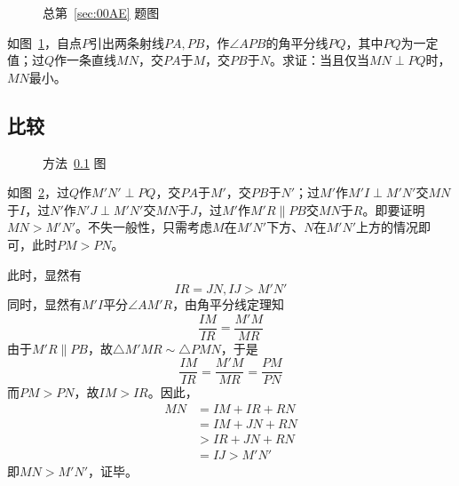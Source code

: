 

\begin{figure}[htbp]
  \centering {}
  \caption{总第~\ref{sec:00AE} 题图} \label{fig:00AE}
\end{figure}

如图~\ref{fig:00AE}，自点$P$引出两条射线$PA, PB$，作$\angle APB$的角平分线$PQ$，其中$PQ$为一定值；过$Q$作一条直线$MN$，交$PA$于$M$，交$PB$于$N$。求证：当且仅当$MN \perp PQ$时，$MN$最小。

\subsection{比较} \label{subsec:00AE-cmp}

\begin{figure}[htbp]
  \centering {}
  \caption{方法~\ref{subsec:00AE-cmp} 图} \label{fig:00AE-cmp}
\end{figure}

如图~\ref{fig:00AE-cmp}，过$Q$作$M'N' \perp PQ$，交$PA$于$M'$，交$PB$于$N'$；过$M'$作$M'I \perp M'N'$交$MN$于$I$，过$N'$作$N'J \perp M'N'$交$MN$于$J$，过$M'$作$M'R \parallel PB$交$MN$于$R$。即要证明$MN > M'N'$。不失一般性，只需考虑$M$在$M'N'$下方、$N$在$M'N'$上方的情况即可，此时$PM > PN$。

此时，显然有
\[ IR = JN, IJ > M'N' \]
同时，显然有$M'I$平分$\angle AM'R$，由角平分线定理知
\[ \frac{IM}{IR} = \frac{M'M}{MR} \]
由于$M'R \parallel PB$，故$\triangle M'MR \sim \triangle PMN$，于是
\[ \frac{IM}{IR} = \frac{M'M}{MR} = \frac{PM}{PN} \]
而$PM > PN$，故$IM > IR$。因此，
\begin{align*}
  MN &= IM + IR + RN \\
  &= IM + JN + RN \\
  &> IR + JN + RN \\
  &= IJ > M'N'
\end{align*}
即$MN > M'N'$，证毕。
